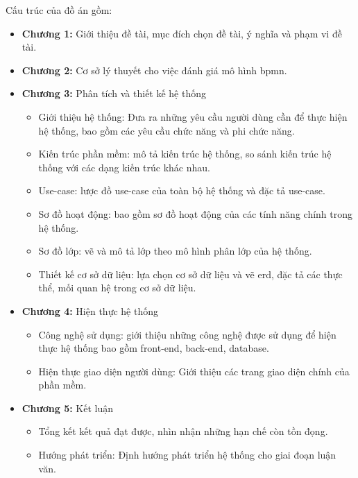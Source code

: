 Cấu trúc của đồ án gồm:
\begin{itemize}
    \item \textbf{Chương 1:} Giới thiệu đề tài, mục đích chọn đề tài, ý nghĩa và phạm vi đề tài.
    \item \textbf{Chương 2:} Cơ sở lý thuyết cho việc đánh giá mô hình \acrshort{bpmn}.
    \item \textbf{Chương 3:} Phân tích và thiết kế hệ thống
          \begin{itemize}
              \item Giới thiệu hệ thống: Đưa ra những yêu cầu người dùng cần để thực hiện hệ thống,
                    bao gồm các yêu cầu chức năng và phi chức năng.
              \item Kiến trúc phần mềm: mô tả kiến trúc hệ thống, so sánh kiến trúc hệ thống với
                    các dạng kiến trúc khác nhau.
              \item Use-case: lược đồ use-case của toàn bộ hệ thống và đặc tả use-case.
              \item Sơ đồ hoạt động: bao gồm sơ đồ hoạt động của các tính năng chính trong hệ
                    thống.
              \item Sơ đồ lớp: vẽ và mô tả lớp theo mô hình phân lớp của hệ thống.
              \item Thiết kế cơ sở dữ liệu: lựa chọn cơ sở dữ liệu và vẽ \acrfull*{erd}, đặc tả các thực thể,
                    mối quan hệ trong cơ sở dữ liệu.
          \end{itemize}
    \item \textbf{Chương 4:} Hiện thực hệ thống
          \begin{itemize}
              \item Công nghệ sử dụng: giới thiệu những công nghệ được sử dụng để hiện thực hệ
                    thống bao gồm front-end, back-end, database.
              \item Hiện thực giao diện người dùng: Giới thiệu các trang giao diện chính của phần
                    mềm.
          \end{itemize}
    \item \textbf{Chương 5:} Kết luận
          \begin{itemize}
              \item Tổng kết kết quả đạt được, nhìn nhận những hạn chế còn tồn đọng.
              \item Hướng phát triển: Định hướng phát triển hệ thống cho giai đoạn luận văn.
          \end{itemize}
\end{itemize}